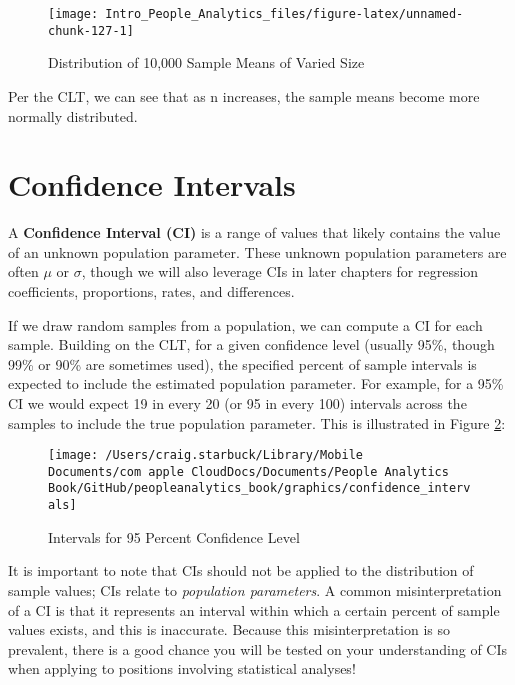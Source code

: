 \documentclass[
]{book}
\begin{document}
\begin{figure}

{\centering \texttt{[image: Intro\_People\_Analytics\_files/figure-latex/unnamed-chunk-127-1]} 

}

\caption{Distribution of 10,000 Sample Means of Varied Size}\label{fig:unnamed-chunk-127}
\end{figure}

Per the CLT, we can see that as n increases, the sample means become more normally distributed.

\hypertarget{confidence-intervals}{%
\section{Confidence Intervals}\label{confidence-intervals}}

A \textbf{Confidence Interval (CI)} is a range of values that likely contains the value of an unknown population parameter. These unknown population parameters are often \(\mu\) or \(\sigma\), though we will also leverage CIs in later chapters for regression coefficients, proportions, rates, and differences.

If we draw random samples from a population, we can compute a CI for each sample. Building on the CLT, for a given confidence level (usually 95\%, though 99\% or 90\% are sometimes used), the specified percent of sample intervals is expected to include the estimated population parameter. For example, for a 95\% CI we would expect 19 in every 20 (or 95 in every 100) intervals across the samples to include the true population parameter. This is illustrated in Figure \ref{fig:conf-int}:

\begin{figure}

{\centering \texttt{[image: /Users/craig.starbuck/Library/Mobile Documents/com~apple~CloudDocs/Documents/People Analytics Book/GitHub/peopleanalytics\_book/graphics/confidence\_intervals]} 

}

\caption{Intervals for 95 Percent Confidence Level}\label{fig:conf-int}
\end{figure}

It is important to note that CIs should not be applied to the distribution of sample values; CIs relate to \emph{population parameters}. A common misinterpretation of a CI is that it represents an interval within which a certain percent of sample values exists, and this is inaccurate. Because this misinterpretation is so prevalent, there is a good chance you will be tested on your understanding of CIs when applying to positions involving statistical analyses!
\end{document}
